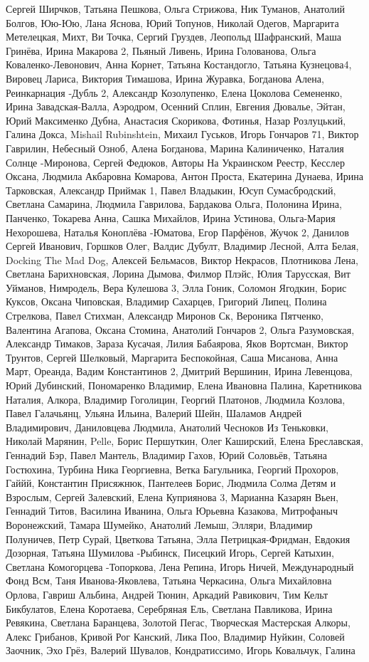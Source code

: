 Сергей Ширчков, Татьяна Пешкова, Ольга Стрижова, Ник Туманов, Анатолий Болгов, Юю-Юю, Лана Яснова, Юрий Топунов, Николай Одегов, Маргарита Метелецкая, Михт, Ви Точка, Сергий Груздев, Леопольд Шафранский, Маша Гринёва, Ирина Макарова 2, Пьяный Ливень, Ирина Голованова, Ольга Коваленко-Левонович, Анна Корнет, Татьяна Костандогло, Татьяна Кузнецова4, Вировец Лариса, Виктория Тимашова, Ирина Журавка, Богданова Алена, Реинкарнация -Дубль 2, Александр Козолупенко, Елена Цоколова Семененко, Ирина Завадская-Валла, Аэродром, Осенний Сплин, Евгения Дювалье, Эйтан, Юрий Максименко Дубна, Анастасия Скорикова, Фотинья, Назар Розлуцький, Галина Докса, Mishail Rubinshtein, Михаил Гуськов, Игорь Гончаров 71, Виктор Гаврилин, Небесный Озноб, Алена Богданова, Марина Калиниченко, Наталия Солнце -Миронова, Сергей Федюков, Авторы На Украинском Реестр, Кесслер Оксана, Людмила Акбаровна Комарова, Антон Проста, Екатерина Дунаева, Ирина Тарковская, Александр Приймак 1, Павел Владыкин, Юсуп Сумасбродский, Светлана Самарина, Людмила Гаврилова, Бардакова Ольга, Полонина Ирина, Панченко, Токарева Анна, Сашка Михайлов, Ирина Устинова, Ольга-Мария Нехорошева, Наталья Коноплёва -Юматова, Егор Парфёнов, Жучок 2, Данилов Сергей Иванович, Горшков Олег, Валдис Дубулт, Владимир Лесной, Алта Белая, Docking The Mad Dog, Алексей Бельмасов, Виктор Некрасов, Плотникова Лена, Светлана Барихновская, Лорина Дымова, Филмор Плэйс, Юлия Тарусская, Вит Уйманов, Нимродель, Вера Кулешова 3, Элла Гоник, Соломон Ягодкин, Борис Куксов, Оксана Чиповская, Владимир Сахарцев, Григорий Липец, Полина Стрелкова, Павел Стихман, Александр Миронов Ск, Вероника Пятченко, Валентина Агапова, Оксана Стомина, Анатолий Гончаров 2, Ольга Разумовская, Александр Тимаков, Зараза Кусачая, Лилия Бабаярова, Яков Вортсман, Виктор Трунтов, Сергей Шелковый, Маргарита Беспокойная, Саша Мисанова, Анна Март, Ореанда, Вадим Константинов 2, Дмитрий Вершинин, Ирина Левенцова, Юрий Дубинский, Пономаренко Владимир, Елена Ивановна Палина, Каретникова Наталия, Алкора, Владимир Гоголицин, Георгий Платонов, Людмила Козлова, Павел Галачьянц, Ульяна Ильина, Валерий Шейн, Шаламов Андрей Владимирович, Даниловцева Людмила, Анатолий Чесноков Из Теньковки, Николай Марянин, Pelle, Борис Першуткин, Олег Каширский, Елена Бреславская, Геннадий Бэр, Павел Мантель, Владимир Гахов, Юрий Соловьёв, Татьяна Гостюхина, Турбина Ника Георгиевна, Ветка Багульника, Георгий Прохоров, Гаййй, Константин Присяжнюк, Пантелеев Борис, Людмила Солма Детям и Взрослым, Сергей Залевский, Елена Куприянова 3, Марианна Казарян Вьен, Геннадий Титов, Василина Иванина, Ольга Юрьевна Казакова, Митрофаныч Воронежский, Тамара Шумейко, Анатолий Лемыш, Элляри, Владимир Полуничев, Петр Сурай, Цветкова Татьяна, Элла Петрицкая-Фридман, Евдокия Дозорная, Татьяна Шумилова -Рыбинск, Писецкий Игорь, Сергей Катыхин, Светлана Комогорцева -Топоркова, Лена Репина, Игорь Ничей, Международный Фонд Всм, Таня Иванова-Яковлева, Татьяна Черкасина, Ольга Михайловна Орлова, Гавриш Альбина, Андрей Тюнин, Аркадий Равикович, Тим Кельт Бикбулатов, Елена Коротаева, Серебряная Ель, Светлана Павликова, Ирина Ревякина, Светлана Баранцева, Золотой Пегас, Творческая Мастерская Алкоры, Алекс Грибанов, Кривой Рог Канский, Лика Поо, Владимир Нуйкин, Соловей Заочник, Эхо Грёз, Валерий Шувалов, Кондратиссимо, Игорь Ковальчук, Галина 